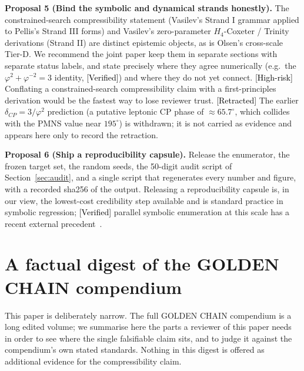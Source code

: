 \documentclass[11pt]{article}
\newcommand{\Verified}{\textcolor{black}{[Verified]}}
\newcommand{\Risk}{\textcolor{black}{[High-risk]}}
\newcommand{\Retr}{\textcolor{black}{[Retracted]}}
\newcommand{\phigr}{\varphi}
\begin{document}
\medskip\noindent\textbf{Proposal 5 (Bind the symbolic and dynamical strands honestly).} The constrained-search compressibility statement (Vasilev's Strand I grammar applied to Pellis's Strand III forms) and Vasilev's zero-parameter $H_4$-Coxeter / Trinity derivations (Strand II) are distinct epistemic objects, as is Olsen's cross-scale Tier-D. We recommend the joint paper keep them in separate sections with separate status labels, and state precisely where they agree numerically (e.g.\ the $\phigr^2 + \phigr^{-2} = 3$ identity, \Verified{}) and where they do not yet connect. \Risk{} Conflating a constrained-search compressibility claim with a first-principles derivation would be the fastest way to lose reviewer trust. \Retr{} The earlier $\delta_{CP} = 3/\phigr^2$ prediction (a putative leptonic CP phase of $\approx 65.7^{\circ}$, which collides with the PMNS value near $195^{\circ}$) is withdrawn; it is not carried as evidence and appears here only to record the retraction.

\medskip\noindent\textbf{Proposal 6 (Ship a reproducibility capsule).} Release the enumerator, the frozen target set, the random seeds, the 50-digit audit script of Section~\ref{sec:audit}, and a single script that regenerates every number and figure, with a recorded sha256 of the output. Releasing a reproducibility capsule is, in our view, the lowest-cost credibility step available and is standard practice in symbolic regression; \Verified{} parallel symbolic enumeration at this scale has a recent external precedent~\cite{parallel}.

\section{A factual digest of the GOLDEN CHAIN compendium}\label{sec:digest}
This paper is deliberately narrow. The full GOLDEN CHAIN compendium is a long edited volume; we summarise here the parts a reviewer of this paper needs in order to see where the single falsifiable claim sits, and to judge it against the compendium's own stated standards. Nothing in this digest is offered as additional evidence for the compressibility claim.
\end{document}
